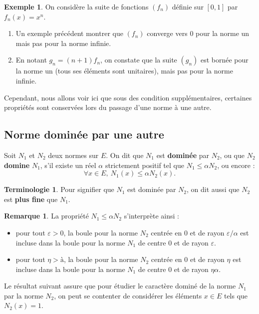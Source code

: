 \documentclass[french]{article}
\theoremstyle{plain}
\theoremstyle{definition}
\newtheorem*{ex}{Exemple}
\newtheorem*{rmq}{Remarque}
\newtheorem*{terminologie}{Terminologie}
\theoremstyle{remark}
\begin{document}
\begin{ex}
	On considère la suite de fonctions $(f_n)$ définie sur $[0,1]$ par $f_n(x)=x^n$.
	\begin{enumerate}
		\item Un exemple précédent montrer que $(f_n)$ converge vers $0$ pour la norme un mais pas pour la norme infinie.
		\item En notant $g_n=(n+1)f_n$, on constate que la suite $(g_n)$ est bornée pour la norme un (tous ses éléments sont unitaires), mais pas pour la norme infinie.
	\end{enumerate}
\end{ex}

Cependant, nous allons voir ici que sous des condition supplémentaires, certaines propriétés sont conservées lors du passage d'une norme à une autre.

\subsection{Norme dominée par une autre}

\begin{dfn}
	Soit $N_1$ et $N_2$ deux normes sur $E$. On dit que $N_1$ est \textbf{dominée} par $N_2$, ou que $N_2$ \textbf{domine} $N_1$, s'il existe un réel $\alpha$ strictement positif tel que $N_1\leqslant\alpha N_2$, ou encore : $$\forall x\in E,\ N_1(x)\leqslant\alpha N_2(x).$$
\end{dfn}

\begin{terminologie}
	Pour signifier que $N_1$ est dominée par $N_2$, on dit aussi que $N_2$ est \textbf{plus fine} que $N_1$.
\end{terminologie}

\begin{rmq}
	La propriété $N_1\leqslant\alpha N_2$ s'interprète ainsi :
	\begin{itemize}
		\item pour tout $\varepsilon>0$, la boule pour la norme $N_2$ centrée en $0$ et de rayon $\varepsilon/\alpha$ est incluse dans la boule pour la norme $N_1$ de centre $0$ et de rayon $\varepsilon$.
		\item pour tout $\eta>à$, la boule pour la norme $N_2$ centrée en $0$ et de rayon $\eta$ est incluse dans la boule pour la norme $N_1$ de centre $0$ et de rayon $\eta\alpha$.
	\end{itemize}
\end{rmq}

Le résultat suivant assure que pour étudier le caractère dominé de la norme $N_1$ par la norme $N_2$, on peut se contenter de considérer les éléments $x\in E$ tels que $N_2(x)=1$.
\end{document}
